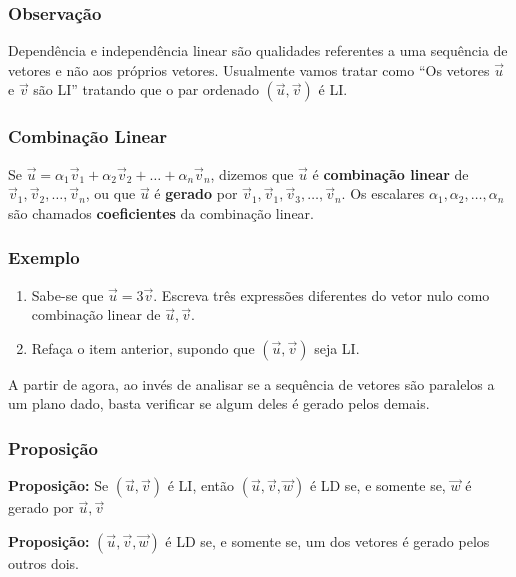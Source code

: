 \documentclass[hyperref={pdfpagelabels=false}]{beamer}
\begin{document}
\begin{frame}
\frametitle{Observação}

Dependência e independência linear são qualidades referentes a uma sequência de vetores e não aos próprios vetores. Usualmente vamos tratar como ``Os vetores $\overrightarrow{u}$ e $\overrightarrow{v}$ são LI'' tratando que o par ordenado $(\overrightarrow{u},\overrightarrow{v})$ é LI.
\end{frame}

\begin{frame}
\frametitle{Combinação Linear}

Se $\overrightarrow{u} = \alpha_1\overrightarrow{v}_1 + \alpha_2\overrightarrow{v}_2+\dots+\alpha_n\overrightarrow{v}_n$, dizemos que $\overrightarrow{u}$ é {\bf combinação linear} de $\overrightarrow{v}_1, \overrightarrow{v}_2, \dots, \overrightarrow{v}_n$, ou que $\overrightarrow{u}$ é {\bf gerado} por $\overrightarrow{v}_1, \overrightarrow{v}_1, \overrightarrow{v}_3,\dots, \overrightarrow{v}_n$. Os escalares $\alpha_1,\alpha_2,\dots,\alpha_n$ são chamados {\bf coeficientes} da combinação linear.

\end{frame}

\begin{frame}
\frametitle{Exemplo} 

\begin{enumerate}
	\item Sabe-se que $\overrightarrow{u} = 3\overrightarrow{v}$. Escreva três expressões diferentes do vetor nulo como combinação linear de $\overrightarrow{u}, \overrightarrow{v}$.
	\item Refaça o item anterior, supondo que $(\overrightarrow{u},\overrightarrow{v})$ seja LI.
\end{enumerate}
\pause

A partir de agora, ao invés de analisar se a sequência de vetores são paralelos a um plano dado, basta verificar se algum deles é gerado pelos demais.
\end{frame}

\begin{frame}
\frametitle{Proposição}

{\bf Proposição: } Se $(\overrightarrow{u},\overrightarrow{v})$ é LI, então $(\overrightarrow{u},\overrightarrow{v},\overrightarrow{w})$ é LD se, e somente se, $\overrightarrow{w}$ é gerado por $\overrightarrow{u}, \overrightarrow{v}$

\pause

{\bf Proposição: } $(\overrightarrow{u},\overrightarrow{v},\overrightarrow{w})$ é LD se, e somente se, um dos vetores é gerado pelos outros dois.
\end{frame}
\end{document}
